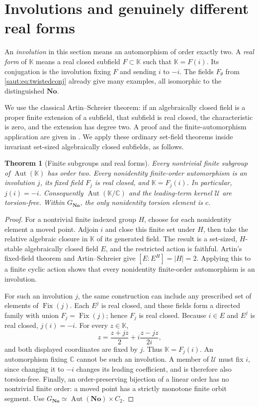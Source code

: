 \documentclass[11pt]{article}
\newtheorem{theorem}{Theorem}[section]
\theoremstyle{definition}
\theoremstyle{remark}
\newcommand{\No}{\mathbf{No}}
\newcommand{\C}{\mathbb C}
\newcommand{\K}{\mathbb K}
\newcommand{\U}{\mathcal U}
\newcommand{\Aut}{\operatorname{Aut}}
\newcommand{\Fix}{\operatorname{Fix}}
\numberwithin{equation}{section}
\begin{document}
\section{Involutions and genuinely different real forms}\label{saut:sec:realforms}

An \emph{involution} in this section means an automorphism of order exactly
two. A \emph{real form} of $\K$ means a real closed subfield $F\subset\K$
such that $\K=F(i)$. Its conjugation is the involution fixing $F$ and sending
$i$ to $-i$. The fields $F_\theta$ from \eqref{saut:eq:twistedconj} already give
many examples, all isomorphic to the distinguished $\No$.

We use the classical Artin--Schreier theorem: if an algebraically closed
field is a proper finite extension of a subfield, that subfield is real
closed, the characteristic is zero, and the extension has degree two.
A proof and the finite-automorphism application are given in \cite{Conrad}.
We apply these ordinary set-field theorems inside invariant set-sized
algebraically closed subfields, as follows.

\begin{theorem}[Finite subgroups and real forms]\label{saut:thm:torsion}
Every nontrivial finite subgroup of $\Aut(\K)$ has order two.
Every nonidentity finite-order automorphism is an involution $j$, its fixed
field $F_j$ is real closed, and $\K=F_j(i)$. In particular, $j(i)=-i$.
Consequently $\Aut(\K/\C)$ and the leading-term kernel $\U$ are torsion-free.
Within $G_{\No}$, the only nonidentity torsion element is $c$.
\end{theorem}
\begin{proof}
For a nontrivial finite indexed group $H$, choose for each nonidentity
element a moved point. Adjoin $i$ and close this finite set under $H$,
then take the relative algebraic closure in $\K$ of its generated field.
The result is a set-sized, $H$-stable algebraically closed field $E$,
and the restricted action is faithful. Artin's fixed-field theorem and
Artin--Schreier give $[E:E^H]=|H|=2$. Applying this to a finite cyclic
action shows that every nonidentity finite-order automorphism is an
involution.

For such an involution $j$, the same construction can include any prescribed
set of elements of $\Fix(j)$. Each $E^j$ is real closed, and these fields
form a directed family with union $F_j=\Fix(j)$; hence $F_j$ is real closed.
Because $i\in E$ and $E^j$ is real closed, $j(i)=-i$. For every $z\in\K$,
\[
 z=\frac{z+jz}{2}+i\frac{z-jz}{2i},
\]
and both displayed coordinates are fixed by $j$. Thus $\K=F_j(i)$.
An automorphism fixing $\C$ cannot be such an involution.
A member of $\U$ must fix $i$, since changing it to $-i$ changes its leading
coefficient, and is therefore also torsion-free.
Finally, an order-preserving bijection of a linear order has no nontrivial
finite order: a moved point has a strictly monotone finite orbit segment.
Use $G_{\No}\simeq\Aut(\No)\times C_2$.
\end{proof}
\end{document}
